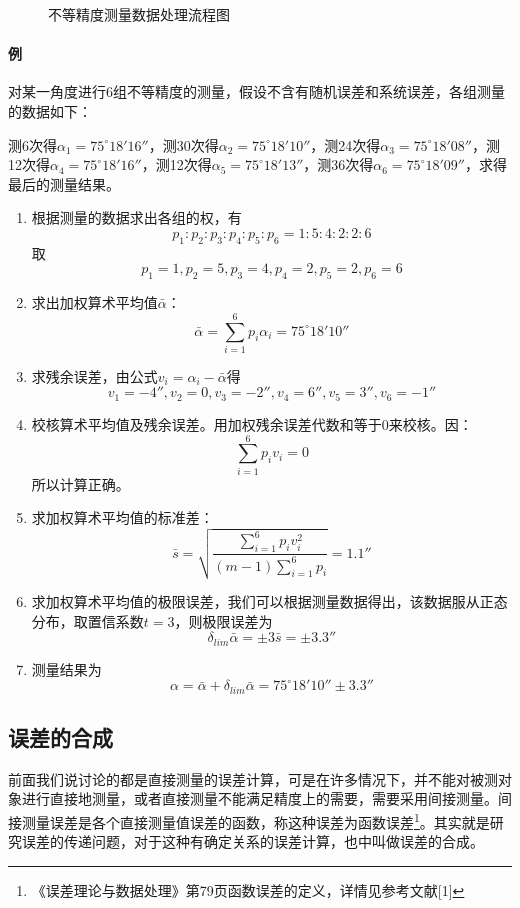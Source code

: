 \begin{figure}[H]
	\caption{不等精度测量数据处理流程图}
\end{figure}
\paragraph{例}对某一角度进行6组不等精度的测量，假设不含有随机误差和系统误差，各组测量的数据如下：

测6次得$ \alpha_1=75^\circ18'16'' $，测30次得$ \alpha_2=75^\circ18'10'' $，测24次得$ \alpha_3=75^\circ18'08'' $，测12次得$ \alpha_4=75^\circ18'16'' $，测12次得$ \alpha_5=75^\circ18'13'' $，测36次得$ \alpha_6=75^\circ18'09'' $，求得最后的测量结果。
\begin{enumerate}
	\item 根据测量的数据求出各组的权，有\[ p_1:p_2:p_3:p_4:p_5:p_6=1:5:4:2:2:6 \]取\[ p_1=1,p_2=5,p_3=4,p_4=2,p_5=2,p_6=6 \]
	\item 求出加权算术平均值$ \bar{\alpha} $：\[ \bar{\alpha}=\sum_{i=1}^{6}p_i\alpha_i=75^\circ18'10'' \]
	\item 求残余误差，由公式$ v_i=\alpha_i-\bar{\alpha} $得\[ v_1=-4'',v_2=0,v_3=-2'',v_4=6'',v_5=3'',v_6=-1'' \]
	\item 校核算术平均值及残余误差。用加权残余误差代数和等于0来校核。因：\[ \sum_{i=1}^{6}p_iv_i=0 \]所以计算正确。
	\item 求加权算术平均值的标准差：\[ \bar{s}=\sqrt{\frac{\sum\limits_{i=1}^{6}p_iv_i^2}{(m-1)\sum\limits_{i=1}^{6}p_i}}=1.1'' \]
	\item 求加权算术平均值的极限误差，我们可以根据测量数据得出，该数据服从正态分布，取置信系数$ t=3 $，则极限误差为\[ \delta_{lim}\bar{\alpha}=\pm3\bar{s}=\pm3.3'' \]
	\item 测量结果为\[ \alpha=\bar{\alpha}+\delta_{lim}\bar{\alpha}=75^\circ18'10''\pm3.3'' \]
\end{enumerate}
\subsection{误差的合成}
前面我们说讨论的都是直接测量的误差计算，可是在许多情况下，并不能对被测对象进行直接地测量，或者直接测量不能满足精度上的需要，需要采用间接测量。间接测量误差是各个直接测量值误差的函数，称这种误差为函数误差\footnote{《误差理论与数据处理》第79页函数误差的定义，详情见参考文献[1]}。其实就是研究误差的传递问题，对于这种有确定关系的误差计算，也中叫做误差的合成。

